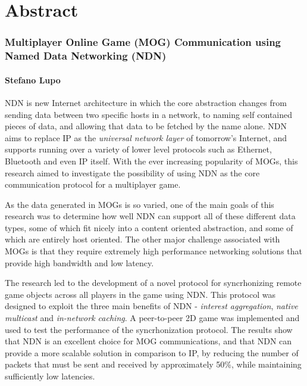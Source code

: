\chapter*{Abstract}
\subsection*{Multiplayer Online Game (MOG) Communication using Named Data Networking (NDN)}
\subsubsection*{Stefano Lupo}
NDN is new Internet architecture in which the core abstraction changes from sending data between two specific hosts in a network, to naming self contained pieces of data, and allowing that data to be fetched by the name alone. NDN aims to replace IP as the \textit{universal network layer} of tomorrow's Internet, and supports running over a variety of lower level protocols such as Ethernet, Bluetooth and even IP itself. With the ever increasing popularity of MOGs, this research aimed to investigate the possibility of using NDN as the core communication protocol for a multiplayer game.

As the data generated in MOGs is so varied, one of the main goals of this research was to determine how well NDN can support all of these different data types, some of which fit nicely into a content oriented abstraction, and some of which are entirely host oriented. The other major challenge associated with MOGs is that they require extremely high performance networking solutions that provide high bandwidth and low latency.

The research led to the development of a novel protocol for syncrhonizing remote game objects across all players in the game using NDN. This protocol was designed to exploit the three main benefits of NDN - \textit{interest aggregation}, \textit{native multicast} and \textit{in-network caching}. A peer-to-peer 2D game was implemented and used to test the performance of the syncrhonization protocol. The results show that NDN is an excellent choice for MOG communications, and that NDN can provide a more scalable solution in comparison to IP, by reducing the number of packets that must be sent and received by approximately 50\%, while maintaining sufficiently low latencies.
